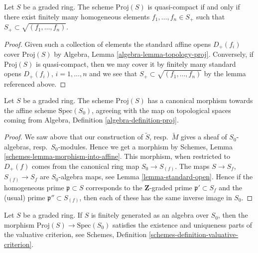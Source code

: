 \begin{lemma}
\label{lemma-proj-quasi-compact}
Let $S$ be a graded ring.
The scheme $\text{Proj}(S)$ is quasi-compact if and only
if there exist finitely many homogeneous elements
$f_1, \ldots, f_n \in S_{+}$ such that
$S_{+} \subset \sqrt{(f_1, \ldots, f_n)}$.
\end{lemma}

\begin{proof}
Given such a collection of elements the standard affine opens
$D_{+}(f_i)$ cover $\text{Proj}(S)$ by
Algebra, Lemma \ref{algebra-lemma-topology-proj}.
Conversely, if $\text{Proj}(S)$ is quasi-compact, then we
may cover it by finitely many standard opens
$D_{+}(f_i)$, $i = 1, \ldots, n$ and we see that
$S_{+} \subset \sqrt{(f_1, \ldots, f_n)}$ by the
lemma referenced above.
\end{proof}

\begin{lemma}
\label{lemma-structure-morphism-proj}
Let $S$ be a graded ring. The scheme $\text{Proj}(S)$ has a canonical morphism
towards the affine scheme $\text{Spec}(S_0)$, agreeing with the map on
topological spaces coming from
Algebra, Definition \ref{algebra-definition-proj}.
\end{lemma}

\begin{proof}
We saw above that our construction of $\widetilde S$, resp.\ 
$\widetilde M$ gives a sheaf of $S_0$-algebras, resp.\ $S_0$-modules.
Hence we get a morphism by
Schemes, Lemma \ref{schemes-lemma-morphism-into-affine}.
This morphism, when restricted to $D_{+}(f)$ comes from the
canonical ring map $S_0 \to S_{(f)}$. The maps
$S \to S_f$, $S_{(f)} \to S_f$ are $S_0$-algebra maps, see
Lemma \ref{lemma-standard-open}.
Hence if the homogeneous prime $\mathfrak p \subset S$
corresponds to the $\mathbf{Z}$-graded prime $\mathfrak p' \subset S_f$
and the (usual) prime $\mathfrak p'' \subset S_{(f)}$, then
each of these has the same inverse image in $S_0$.
\end{proof}

\begin{lemma}
\label{lemma-proj-valuative-criterion}
Let $S$ be a graded ring. If $S$ is finitely generated as
an algebra over $S_0$, then
the morphism $\text{Proj}(S) \to \text{Spec}(S_0)$ satisfies
the existence and uniqueness parts of the valuative criterion,
see Schemes, Definition \ref{schemes-definition-valuative-criterion}.
\end{lemma}

